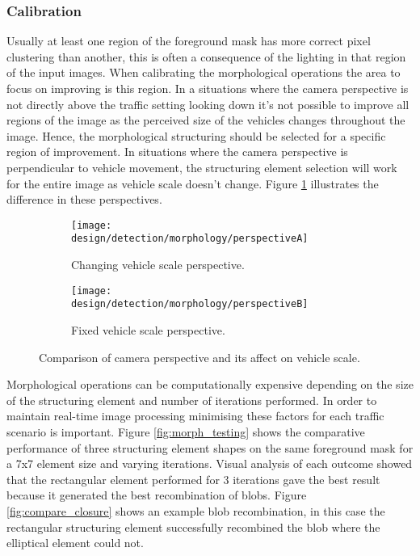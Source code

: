 \subsubsection{Calibration}

Usually at least one region of the foreground mask has more correct pixel clustering than another, this is often a consequence of the lighting in that region of the input images. When calibrating the morphological operations the area to focus on improving is this region. In a situations where the camera perspective is not directly above the traffic setting looking down it's not possible to improve all regions of the image as the perceived size of the vehicles changes throughout the image. Hence, the morphological structuring should be selected for a specific region of improvement. In situations where the camera perspective is perpendicular to vehicle movement, the structuring element selection will work for the entire image as vehicle scale doesn't change. Figure \ref{fig:perspective} illustrates the difference in these perspectives.

\begin{figure}[h]
    \centering
     \begin{subfigure}[b]{0.45\textwidth}
        \texttt{[image: design/detection/morphology/perspectiveA]}
	\captionsetup{format = hang}
        \caption{Changing vehicle scale perspective.}
    \end{subfigure} 
    \begin{subfigure}[b]{0.45\textwidth}
        \texttt{[image: design/detection/morphology/perspectiveB]}	
	\captionsetup{format = hang}
        \caption{Fixed vehicle scale perspective.}
    \end{subfigure}
    \captionsetup{format = hang}
    \caption{Comparison of camera perspective and its affect on vehicle scale.}
    \label{fig:perspective}
\end{figure}

Morphological operations can be computationally expensive depending on the size of the structuring element and number of iterations performed. In order to maintain real-time image processing minimising these factors for each traffic scenario is important. Figure \ref{fig:morph_testing} shows the comparative performance of three structuring element shapes on the same foreground mask for a 7x7 element size and varying iterations. Visual analysis of each outcome showed that the rectangular element performed for 3 iterations gave the best result because it generated the best recombination of blobs. Figure \ref{fig:compare_closure} shows an example blob recombination, in this case the rectangular structuring element successfully recombined the blob where the elliptical element could not.

